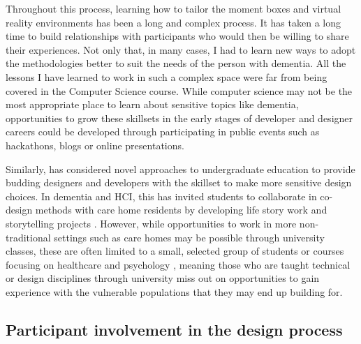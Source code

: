 Throughout this process, learning how to tailor the moment boxes and virtual reality environments has been a long and complex process. It has taken a long time to build relationships with participants who would then be willing to share their experiences. Not only that, in many cases, I had to learn new ways to adopt the methodologies better to suit the needs of the person with dementia. All the lessons I have learned to work in such a complex space were far from being covered in the Computer Science course. While computer science may not be the most appropriate place to learn about sensitive topics like dementia, opportunities to grow these skillsets in the early stages of developer and designer careers could be developed through participating in public events such as hackathons, blogs or online presentations.

Similarly, \cite{hendriks_valuing_2018} has considered novel approaches to undergraduate education to provide budding designers and developers with the skillset to make more sensitive design choices. In dementia and HCI, this has invited students to collaborate in co-design methods with care home residents by developing life story work \citep{mckeown2015you} and storytelling projects \citep{hyden2013storytelling}. However, while opportunities to work in more non-traditional settings such as care homes may be possible through university classes, these are often limited to a small, selected group of students or courses focusing on healthcare and psychology \citep{kinnunen_understanding_2018}, meaning those who are taught technical or design disciplines through university miss out on opportunities to gain experience with the vulnerable populations that they may end up building for. 

\subsection{Participant involvement in the design process}
\label{extent-co-design}

